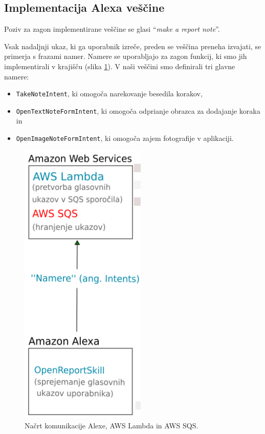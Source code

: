 \documentclass[a4paper, 12pt]{book}
\begin{document}

\subsection{Implementacija Alexa veščine}

Poziv za zagon implementirane veščine se glasi \enquote{\textit{make a report note}}.

Vsak nadaljnji ukaz, ki ga uporabnik izreče, preden se veščina preneha izvajati, se primerja s frazami namer.
Namere se uporabljajo za zagon funkcij, ki smo jih implementirali v krajišču (slika \ref{plan_alexa_sqs}).
V naši veščini smo definirali tri glavne namere:

\begin{itemize}
	\item \texttt{TakeNoteIntent}, ki omogoča narekovanje besedila korakov,
	\item \texttt{OpenTextNoteFormIntent}, ki omogoča odprianje obrazca za dodajanje koraka in
	\item \texttt{OpenImageNoteFormIntent}, ki omogoča zajem fotografije v aplikaciji.
\end{itemize}

\clearpage

\begin{figure}[H]
\begin{center}
\includegraphics[width=6cm]{plan_alexa_sqs}
\end{center}
\caption{Načrt komunikacije Alexe, AWS Lambda in AWS SQS.}
\label{plan_alexa_sqs}
\end{figure}
\end{document}
